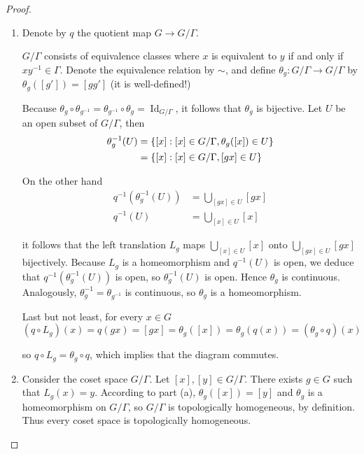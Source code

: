 \begin{proof}
	\begin{enumerate}[label={(\alph*)}]
		\item Denote by $q$ the quotient map $G\to G/\Gamma$.

		      $G/\Gamma$ consists of equivalence classes where $x$ is equivalent to $y$ if and only if $xy^{-1} \in \Gamma$. Denote the equivalence relation by $\sim$, and define $\theta_{g}: G/\Gamma \to G/\Gamma$ by $\theta_{g}([g']) = [gg']$ (it is well-defined!)

		      Because $\theta_{g}\circ \theta_{g^{-1}} = \theta_{g^{-1}}\circ \theta_{g} = \operatorname{Id}_{G/\Gamma}$, it follows that $\theta_{g}$ is bijective. Let $U$ be an open subset of $G/\Gamma$, then
		      \begin{align*}
			      \theta_{g}^{-1}(U) & = \left\{{ [x] : [x] \in G/\Gamma, \theta_{g}([x]) \in U }\right\} \\
			                         & = \left\{{ [x] : [x] \in G/\Gamma, [gx] \in U }\right\}
		      \end{align*}

		      On the other hand
		      \begin{align*}
			      q^{-1}(\theta_{g}^{-1}(U)) & = \bigcup_{[gx] \in U} [gx] \\
			      q^{-1}(U)                  & = \bigcup_{[x] \in U} [x]
		      \end{align*}

		      it follows that the left translation $L_{g}$ maps $\bigcup_{[x] \in U} [x]$ onto $\bigcup_{[gx] \in U} [gx]$ bijectively. Because $L_{g}$ is a homeomorphism and $q^{-1}(U)$ is open, we deduce that $q^{-1}(\theta_{g}^{-1}(U))$ is open, so $\theta_{g}^{-1}(U)$ is open. Hence $\theta_{g}$ is continuous. Analogously, $\theta_{g}^{-1} = \theta_{g^{-1}}$ is continuous, so $\theta_{g}$ is a homeomorphism.

		      Last but not least, for every $x\in G$
		      \begin{equation*}
			      (q\circ L_{g})(x) = q(gx) = [gx] = \theta_{g}([x]) = \theta_{g}(q(x)) = (\theta_{g}\circ q)(x)
		      \end{equation*}

		      so $q\circ L_{g} = \theta_{g}\circ q$, which implies that the diagram commutes.
		\item Consider the coset space $G/\Gamma$. Let $[x], [y] \in G/\Gamma$. There exists $g\in G$ such that $L_{g}(x) = y$. According to part (a), $\theta_{g}([x]) = [y]$ and $\theta_{g}$ is a homeomorphism on $G/\Gamma$, so $G/\Gamma$ is topologically homogeneous, by definition. Thus every coset space is topologically homogeneous.
	\end{enumerate}
\end{proof}

